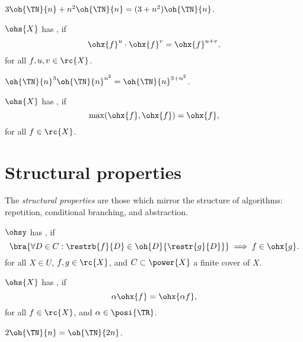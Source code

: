 \documentclass[b5paper, english, oneside]{memoir}
\begin{document}
\begin{example}
$3 \oh{\TN}{n} + n^2 \oh{\TN}{n} = (3 + n^2)\oh{\TN}{n}$.
\end{example}

\begin{definition}
$\ohs{X}$ has , if
\begin{equation}
\ohx{f}^{u} \cdot \ohx{f}^{v} = \ohx{f}^{u + v},
\end{equation}
for all $f, u, v \in \rc{X}$.
\end{definition}

\begin{example}
$\oh{\TN}{n}^3 \oh{\TN}{n}^{n^2} = \oh{\TN}{n}^{3 + n^2}$.
\end{example}

\begin{definition}
$\ohs{X}$ has , if
\begin{equation}
\max(\ohx{f}, \ohx{f}) = \ohx{f},
\end{equation}
for all $f \in \rc{X}$.
\end{definition}

\section{Structural properties}

The \emph{structural properties} are those which mirror the structure of algorithms: repetition, conditional branching, and abstraction.

\begin{definition}
$\ohsy$ has , if
\begin{equation}
\bra{\forall D \in C: \restrb{f}{D} \in \oh{D}{\restr{g}{D}}} \implies f \in \ohx{g}.
\end{equation}
for all $X \in U$, $f, g \in \rc{X}$, and $C \subset \power{X}$ a finite cover of $X$.
\end{definition}

\begin{definition}
$\ohs{X}$ has , if
\begin{equation}
\alpha \ohx{f} = \ohx{\alpha f},
\end{equation}
for all $f \in \rc{X}$, and $\alpha \in \posi{\TR}$.
\end{definition}

\begin{example}
$2 \oh{\TN}{n} = \oh{\TN}{2n}$.
\end{example}
\end{document}
